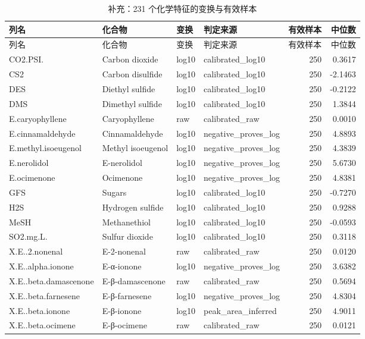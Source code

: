 {\footnotesize
\setlength{\tabcolsep}{3.5pt}
\begin{longtable}{llllrr}
\caption{补充：231 个化学特征的变换与有效样本}
\label{tab:s02_transform}\\
\toprule
列名 & 化合物 & 变换 & 判定来源 & 有效样本 & 中位数 \\
\midrule
\endfirsthead
\toprule
列名 & 化合物 & 变换 & 判定来源 & 有效样本 & 中位数 \\
\midrule
\endhead
\bottomrule
\endlastfoot
CO2.PSI. & Carbon dioxide & log10 & calibrated\_log10 & 250 & 0.3617 \\
CS2 & Carbon disulfide & log10 & calibrated\_log10 & 250 & -2.1463 \\
DES & Diethyl sulfide & log10 & calibrated\_log10 & 250 & -0.2122 \\
DMS & Dimethyl sulfide & log10 & calibrated\_log10 & 250 & 1.3844 \\
E.caryophyllene & Caryophyllene & raw & calibrated\_raw & 250 & 0.0010 \\
E.cinnamaldehyde & Cinnamaldehyde & log10 & negative\_proves\_log & 250 & 4.8893 \\
E.methyl.isoeugenol & Methyl isoeugenol & log10 & negative\_proves\_log & 250 & 4.3839 \\
E.nerolidol & E-nerolidol & log10 & negative\_proves\_log & 250 & 5.6730 \\
E.ocimenone & Ocimenone & log10 & negative\_proves\_log & 250 & 4.8381 \\
GFS & Sugars & log10 & calibrated\_log10 & 250 & -0.7270 \\
H2S & Hydrogen sulfide & log10 & calibrated\_log10 & 250 & 0.9288 \\
MeSH & Methanethiol & log10 & calibrated\_log10 & 250 & -0.0593 \\
SO2.mg.L. & Sulfur dioxide & log10 & calibrated\_log10 & 250 & 0.3118 \\
X.E..2.nonenal & E-2-nonenal & raw & calibrated\_raw & 250 & 0.0120 \\
X.E..alpha.ionone & E-α-ionone & log10 & negative\_proves\_log & 250 & 3.6382 \\
X.E..beta.damascenone & E-β-damascenone & raw & calibrated\_raw & 250 & 0.5694 \\
X.E..beta.farnesene & E-β-farnesene & log10 & negative\_proves\_log & 250 & 4.8304 \\
X.E..beta.ionone & E-β-ionone & log10 & peak\_area\_inferred & 250 & 4.9011 \\
X.E..beta.ocimene & E-β-ocimene & raw & calibrated\_raw & 250 & 0.0121 \\

\end{longtable}}

